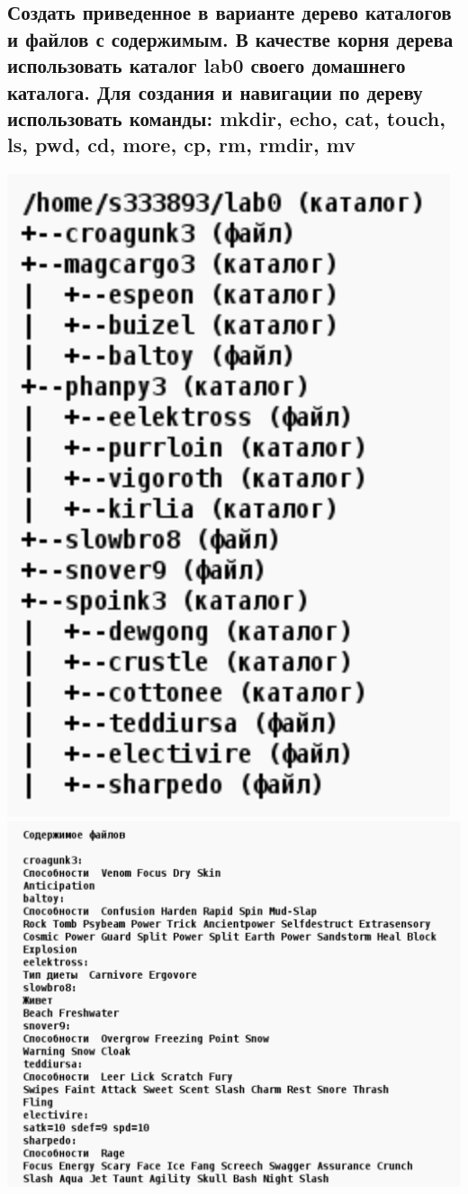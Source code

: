 \documentclass[12pt,onecolumn]{article}
\begin{document}
\subsection{Создать приведенное в варианте дерево каталогов и файлов с содержимым. В качестве корня дерева использовать каталог lab0 своего домашнего каталога. Для создания и навигации по дереву использовать команды: mkdir, echo, cat, touch, ls, pwd, cd, more, cp, rm, rmdir, mv}
\includegraphics[scale=0.7]{p1.png}
\includegraphics[scale=0.5]{p1-2.png}
\end{document}
